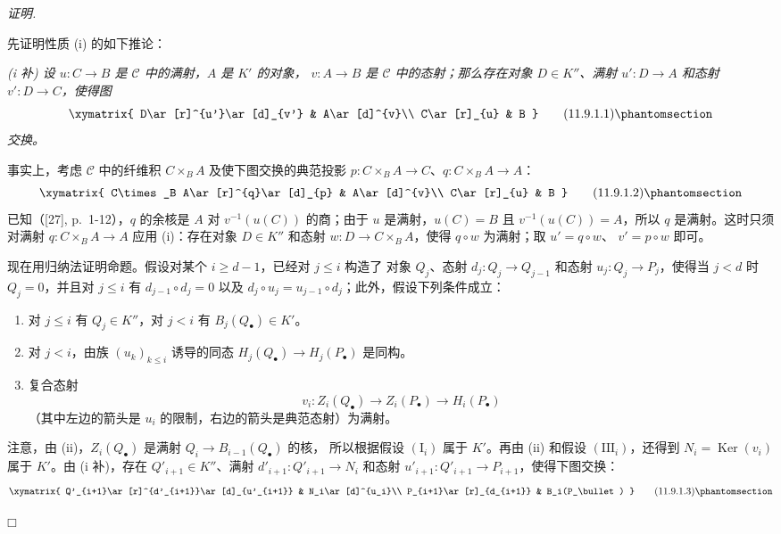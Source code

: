 \documentclass[UTF8,fontset=none,11pt,oneside,openany]{ctexbook}
\providecommand{\square}{\mdlgwhtsquare}
\newenvironment{proof}{%
  \par\smallskip\noindent\textit{证明.}\ %
}{\hfill$\square$\par}
\newcommand{\oldpage}[2][]{%
  \hypertarget{ega-source-page-#1-#2}{}%
  \marginnote{\scriptsize\textbf{#1}~|~#2}\ignorespaces}
\let\EGAOriginalLabel\label
\renewcommand{\label}[1]{\phantomsection\EGAOriginalLabel{#1}}
\begin{document}
\begin{proof}
先证明性质 (i) 的如下推论：

\emph{(i 补) 设 $u:C\to B$ 是 $\mathcal C$ 中的满射，$A$ 是 $K'$ 的对象，
$v:A\to B$ 是 $\mathcal C$ 中的态射；那么存在对象 $D\in K''$、满射
$u':D\to A$ 和态射 $v':D\to C$，使得图}
\[
\xymatrix{
D\ar[r]^{u'}\ar[d]_{v'} & A\ar[d]^{v}\\
C\ar[r]_{u} & B
}
\tag{11.9.1.1}\label{0.11.9.1.1-fr}
\]
\emph{交换。}

事实上，考虑 $\mathcal C$ 中的纤维积 $C\times_B A$ 及使下图交换的典范投影
$p:C\times_B A\to C$、$q:C\times_B A\to A$：
\oldpage[0\textsubscript{III}]{47}
\[
\xymatrix{
C\times_B A\ar[r]^{q}\ar[d]_{p} & A\ar[d]^{v}\\
C\ar[r]_{u} & B
}
\tag{11.9.1.2}\label{0.11.9.1.2-fr}
\]
已知（[27], p.~1-12），$q$ 的余核是 $A$ 对 $v^{-1}(u(C))$ 的商；由于 $u$
是满射，$u(C)=B$ 且 $v^{-1}(u(C))=A$，所以 $q$ 是满射。这时只须对满射
$q:C\times_B A\to A$ 应用 (i)：存在对象 $D\in K''$ 和态射
$w:D\to C\times_B A$，使得 $q\circ w$ 为满射；取 $u'=q\circ w$、
$v'=p\circ w$ 即可。

现在用归纳法证明命题。假设对某个 $i\geq d-1$，已经对 $j\leq i$ 构造了
对象 $Q_j$、态射 $d_j:Q_j\to Q_{j-1}$ 和态射 $u_j:Q_j\to P_j$，使得当
$j<d$ 时 $Q_j=0$，并且对 $j\leq i$ 有 $d_{j-1}\circ d_j=0$ 以及
$d_j\circ u_j=u_{j-1}\circ d_j$；此外，假设下列条件成立：
\begin{enumerate}
\item[$(\mathrm I_i)$] 对 $j\leq i$ 有 $Q_j\in K''$，对 $j<i$ 有
$B_j(Q_\bullet)\in K'$。
\item[$(\mathrm{II}_i)$] 对 $j<i$，由族 $(u_k)_{k\leq i}$ 诱导的同态
$H_j(Q_\bullet)\to H_j(P_\bullet)$ 是同构。
\item[$(\mathrm{III}_i)$] 复合态射
\[
v_i:Z_i(Q_\bullet)\longrightarrow Z_i(P_\bullet)
\longrightarrow H_i(P_\bullet)
\]
（其中左边的箭头是 $u_i$ 的限制，右边的箭头是典范态射）为满射。
\end{enumerate}
注意，由 (ii)，$Z_i(Q_\bullet)$ 是满射 $Q_i\to B_{i-1}(Q_\bullet)$ 的核，
所以根据假设 $(\mathrm I_i)$ 属于 $K'$。再由 (ii) 和假设
$(\mathrm{III}_i)$，还得到 $N_i=\operatorname{Ker}(v_i)$ 属于 $K'$。由
(i 补)，存在 $Q'_{i+1}\in K''$、满射 $d'_{i+1}:Q'_{i+1}\to N_i$ 和态射
$u'_{i+1}:Q'_{i+1}\to P_{i+1}$，使得下图交换：
\[
\xymatrix{
Q'_{i+1}\ar[r]^{d'_{i+1}}\ar[d]_{u'_{i+1}} &
N_i\ar[d]^{u_i}\\
P_{i+1}\ar[r]_{d_{i+1}} & B_i(P_\bullet)
}
\tag{11.9.1.3}\label{0.11.9.1.3-fr}
\]


\end{proof}
\end{document}
